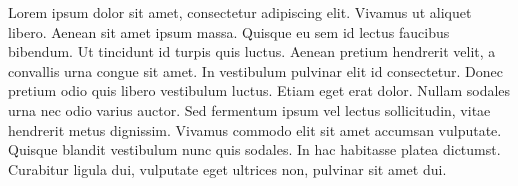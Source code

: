 Lorem ipsum dolor sit amet, consectetur adipiscing elit. Vivamus ut aliquet libero. Aenean sit amet ipsum massa. Quisque eu sem id lectus faucibus bibendum. Ut tincidunt id turpis quis luctus. Aenean pretium hendrerit velit, a convallis urna congue sit amet. In vestibulum pulvinar elit id consectetur. Donec pretium odio quis libero vestibulum luctus. Etiam eget erat dolor. Nullam sodales urna nec odio varius auctor. Sed fermentum ipsum vel lectus sollicitudin, vitae hendrerit metus dignissim. Vivamus commodo elit sit amet accumsan vulputate. Quisque blandit vestibulum nunc quis sodales. In hac habitasse platea dictumst. Curabitur ligula dui, vulputate eget ultrices non, pulvinar sit amet dui.
